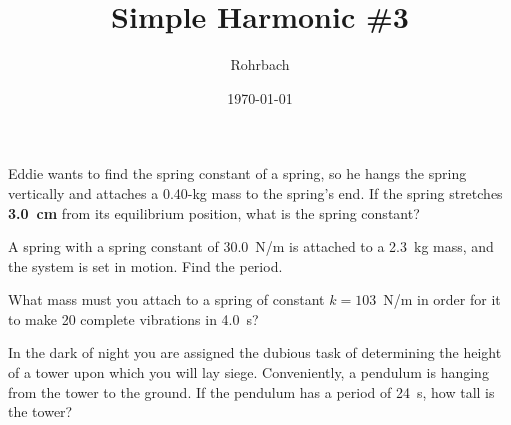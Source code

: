 \documentclass[10pt]{exam}
\title{Simple Harmonic \#3}
\author{Rohrbach}
\date{\today}
\begin{document}
\maketitle

\begin{questions}

\question
  Eddie wants to find the spring constant of a spring, so he hangs the spring vertically and attaches a 0.40-kg mass to the spring's end.  If the spring stretches {\bf 3.0~cm} from its equilibrium position, what is the spring constant?
  \vs

\question
  A spring with a spring constant of 30.0~N/m is attached to a 2.3~kg mass, and the system is set in motion.  Find the period.
  \vs

\question
  What mass must you attach to a spring of constant $k=103$~N/m in order for it to make 20 complete vibrations in 4.0~s?
  \vs[2]


\question 
  In the dark of night you are assigned the dubious task of determining the height of a tower upon which you will lay siege.  Conveniently, a pendulum is hanging from the tower to the ground.  If the pendulum has a period of 24~s, how tall is the tower?







  

\end{questions}
\end{document}

